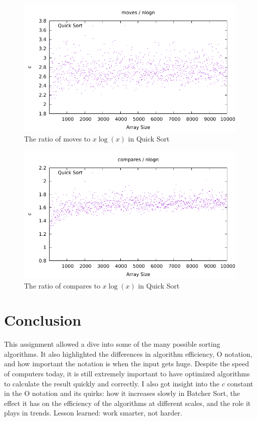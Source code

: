 \documentclass[12pt]{article}
\begin{document}
\begin{figure}[H]\begin{centering}
\includegraphics{plots/nlogn-moves-quick.pdf}\caption{The ratio of moves to $x\log(x)$ in Quick Sort}
\end{centering}\end{figure}
\begin{figure}[H]\begin{centering}
\includegraphics{plots/nlogn-compares-quick.pdf}\caption{The ratio of compares to $x\log(x)$ in Quick Sort}
\end{centering}\end{figure}

\section{Conclusion}
This assignment allowed a dive into some of the many possible sorting algorithms. It also highlighted the differences in algorithm efficiency, O notation, and how important the notation is when the input gets huge. Despite the speed of computers today, it is still extremely important to have optimized algorithms to calculate the result quickly and correctly. I also got insight into the $c$ constant in the O notation and its quirks: how it increases slowly in Batcher Sort, the effect it has on the efficiency of the algorithms at different scales, and the role it plays in trends. Lesson learned: work smarter, not harder.
\end{document}
